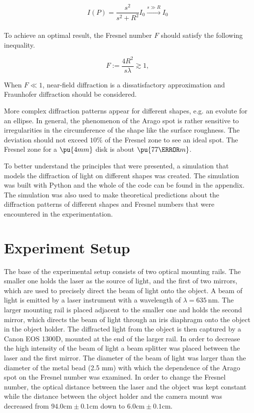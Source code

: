 \documentclass[11pt,a4paper]{article}
\begin{document}
$$I(P) = \frac{s^{2}}{s^{2} + R^{2}} I_{0} \xrightarrow{s \gg R} I_{0}$$ \\[0.5cm]


To achieve an optimal result, the Fresnel number ${ F }$ should satisfy the following inequality.

$$F := \frac{4R^{2}}{s\lambda} \gtrsim 1,$$

When ${ F \ll 1 }$, near-field diffraction is a dissatisfactory approximation and Fraunhofer diffraction should be considered.

More complex diffraction patterns appear for different shapes, e.g. an evolute for an ellipse. In general, the phenomenon of the Arago spot is rather sensitive to irregularities in the circumference of the shape like the surface roughness. The deviation should not exceed $10\%$ of the Fresnel zone to see an ideal spot. The Fresnel zone for a ${ \pu{4mm} }$ disk is about ${ \pu{77\micro m} }$. \cite{WikipediaAragoSpot}


To better understand the principles that were presented, a simulation that models the diffraction of light on different shapes was created. The simulation was built with Python and the whole of the code can be found in the appendix. The simulation was also used to make theoretical predictions about the diffraction patterns of different shapes and Fresnel numbers that were encountered in the experimentation. 


\section{Experiment Setup}
The base of the experimental setup consists of two optical mounting rails. The smaller one holds the laser as the source of light, and the first of two mirrors, which are used to precisely direct the beam of light onto the object. A beam of light is emitted by a laser instrument with a wavelength of $\lambda = 635 \ \text{nm}$. The larger mounting rail is placed adjacent to the smaller one and holds the second mirror, which directs the beam of light through an iris diaphragm onto the object in the object holder. The diffracted light from the object is then captured by a Canon EOS 1300D, mounted at the end of the larger rail.  In order to decrease the high intensity of the beam of light a beam splitter was placed between the laser and the first mirror.  
The diameter of the beam of light was larger than the diameter of the metal bead (2.5 mm) with which the dependence of the Arago spot on the Fresnel number was examined. 
In order to change the Fresnel number, the optical distance between the laser and the object was kept constant while the distance between the object holder and the camera mount was decreased from $94.0 \text{cm} \pm  0.1 \text{cm}$ down to $6.0 \text{cm} \pm 0.1 \text{cm}$. 
\end{document}
